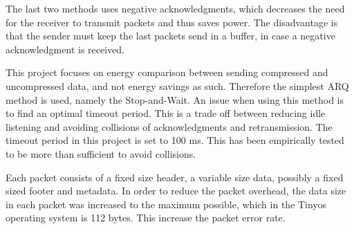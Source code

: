 The last two methods uses negative acknowledgments, which decreases the need for the receiver to transmit packets and thus saves power. The disadvantage is that the sender must keep the last packets send in a buffer, in case a negative acknowledgment is received.

This project focuses on energy comparison between sending compressed and uncompressed data, and not energy savings as such. Therefore the simplest ARQ method is used, namely the Stop-and-Wait. An issue when using this method is to find an optimal timeout period. This is a trade off between reducing idle listening and avoiding collisions of acknowledgments and retransmission. The timeout period in this project is set to 100 ms. This has been empirically tested to be more than sufficient to avoid collisions.

Each packet consists of a fixed size header, a variable size data, possibly a fixed sized footer and metadata. In order to reduce the packet overhead, the data size in each packet was increased to the maximum possible, which in the Tinyos operating system is 112 bytes. This increase the packet error rate.